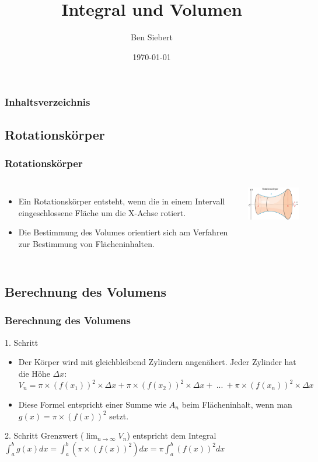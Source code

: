 \documentclass{beamer}
\title{Integral und Volumen}
\author{Ben Siebert}
\date{\today}
\begin{document}
	\frame{\titlepage}
	
	\begin{frame}
		\frametitle{Inhaltsverzeichnis}
		\tableofcontents
	\end{frame}
	

	\begin{frame}
		\section{Rotationskörper}
		\frametitle{Rotationskörper}
		
		\begin{columns}
			\column{0.5\textwidth}
				\begin{itemize}
					\item Ein Rotationskörper entsteht, wenn die in einem Intervall eingeschlossene Fläche um die X-Achse rotiert.
					\item Die Bestimmung des Volumes orientiert sich am Verfahren zur Bestimmung von Flächeninhalten.
				\end{itemize}
			\column{0.5\textwidth}
			\includegraphics[width=4cm]{IMG_1121.jpg}
		\end{columns}
	\end{frame}
	
	\begin{frame}
		\section{Berechnung des Volumens}
		\frametitle{Berechnung des Volumens}
		\begin{block}{1. Schritt}
			\begin{itemize}
				\item Der Körper wird mit gleichbleibend Zylindern angenähert. Jeder Zylinder hat die Höhe $\Delta x$: $V_n = \pi \times (f(x_1))^2 \times \Delta x + \pi \times (f(x_2))^2 \times \Delta x +\ ...\ + \pi \times (f(x_n))^2 \times \Delta x$
				\item Diese Formel entspricht einer Summe wie $A_n$ beim Flächeninhalt, wenn man $g(x) = \pi \times (f(x))^2$ setzt. 
			\end{itemize}			
		\end{block}

		
		\begin{block}{2. Schritt}
			Grenzwert ($\lim_{n\to\infty} V_n$) entspricht dem Integral $\int_{a}^{b} g(x) dx = \int_{a}^{b} (\pi \times (f(x))^2) dx = \pi \int_{a}^{b} (f(x))^2 dx$
		\end{block}
	\end{frame}
	
\end{document}
